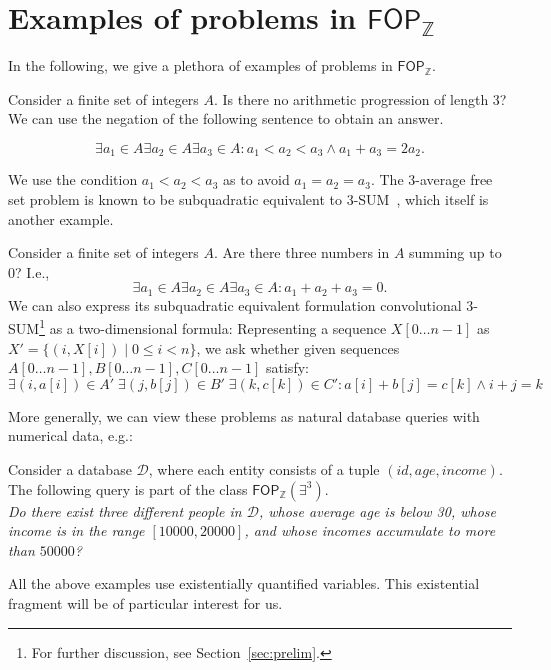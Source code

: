 \section{Examples of problems in $\mathsf{FOP}_{\mathbb{Z}}$} \label{sec:Examples}
In the following, we give a plethora of examples of problems in $\mathsf{FOP}_{\mathbb{Z}}$.
\begin{example}
Consider a finite set of integers $A$. Is there no arithmetic progression of length $3$? 
We can use the negation of the following sentence to obtain an answer.

	\[ \exists a_1 \in A \exists  a_2 \in A \exists a_3 \in A: a_1 <a_2<a_3 \land a_1 +a_3=2a_2.\]
\end{example}
We use the condition $a_1 <a_2 <a_3$ as to avoid $a_1=a_2=a_3$.
The 3-average free set problem is known to be subquadratic equivalent to $3$-SUM~\cite{DBLP:conf/stoc/0001GS20}, which itself is another example.
\begin{example}
Consider a finite set of integers $A$. Are there three numbers in $A$ summing up to $0$? I.e., 
	\[ \exists a_1 \in A \exists  a_2 \in A \exists a_3 \in A: a_1 +a_2+a_3 = 0.\]
	We can also express its subquadratic equivalent formulation convolutional $3$-SUM\footnote{For further discussion, see Section~\ref{sec:prelim}.} as a two-dimensional formula:
	Representing a  sequence $X[0 \dots n-1]$ as $X'=\{ (i,X[i]) \mid 0 \le i < n\}$, we ask whether given sequences $A[0\dots n-1],B[0 \dots n-1],C[0 \dots n-1]$ satisfy:
	\[ \exists (i,a[i])\in A' \; \exists  (j,b[j]) \in B' \; \exists (k,c[k]) \in C': a[i]+b[j]=c[k] \land i+j=k\]
\end{example}

More generally, we can view these problems as natural database queries with numerical data, e.g.: 
\begin{example}
    Consider a database $\mathcal{D}$, where each entity consists of a tuple $(id,age,income)$. 
    The following query is part of the class $\mathsf{FOP}_{\mathbb{Z}}(\exists^3 )$.\\
    \emph{Do there exist three different people in $\mathcal{D}$, whose average age is below 30, whose income is in the range $[10000,20000]$, and
    whose incomes accumulate to more than $50000$?}
\end{example}

All the above examples use existentially quantified variables. This existential fragment will be of particular interest for us.

